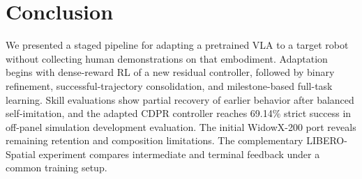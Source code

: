 \section{Conclusion}\label{sec:conclusion}
We presented a staged pipeline for adapting a pretrained VLA to a target robot without collecting human demonstrations on that embodiment. Adaptation begins with dense-reward RL of a new residual controller, followed by binary refinement, successful-trajectory consolidation, and milestone-based full-task learning. Skill evaluations show partial recovery of earlier behavior after balanced self-imitation, and the adapted CDPR controller reaches 69.14\% strict success in off-panel simulation development evaluation. The initial WidowX-200 port reveals remaining retention and composition limitations. The complementary LIBERO-Spatial experiment compares intermediate and terminal feedback under a common training setup.

